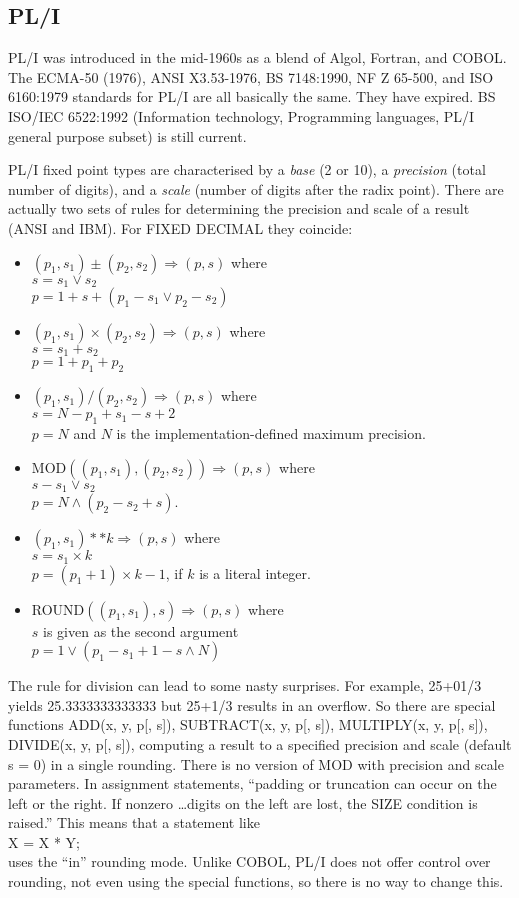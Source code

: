 \documentclass{article}
\begin{document}
\subsection{PL/I}

PL/I was introduced in the mid-1960s as a blend of Algol,
Fortran, and COBOL.  The ECMA-50 (1976), ANSI X3.53-1976, BS 7148:1990,
NF Z 65-500, and ISO 6160:1979 standards for PL/I are all basically the
same.  They have expired.  BS ISO/IEC 6522:1992 (Information technology,
Programming languages, PL/I general purpose subset) is still current.

PL/I fixed point types are characterised by a {\it base} (2 or 10),
a {\it precision} (total number of digits), and a {\it scale} (number
of digits after the radix point).  There are actually two sets of
rules for determining the precision and scale of a result (ANSI and
IBM).  For FIXED DECIMAL they coincide:
\begin{itemize}
\item
$(p_1,s_1) \pm (p_2,s_2) \Rightarrow (p,s)$ where\\
$s = s_1 \vee s_2$\\
$p = 1+s+(p_1-s_1 \vee p_2-s_2)$
\item
$(p_1,s_1) \times (p_2,s_2) \Rightarrow (p,s)$ where\\
$s = s_1 + s_2$\\
$p = 1+p_1+p_2$
\item
$(p_1,s_1) / (p_2,s_2) \Rightarrow (p,s)$ where\\
$s = N-p_1+s_1-s+2$\\
$p = N$ and $N$ is the implementation-defined maximum precision.
\item
MOD$((p_1,s_1), (p_2,s_2)) \Rightarrow (p,s)$ where\\
$s - s_1 \vee s_2$\\
$p = N \wedge (p_2 - s_2 + s)$.
\item
$(p_1,s_1) ** k \Rightarrow (p,s)$ where\\
$s = s_1\times k$\\
$p = (p_1 + 1) \times k - 1$, if $k$ is a literal integer.
\item
ROUND$((p_1,s_1), s) \Rightarrow (p,s)$ where\\
$s$ is given as the second argument\\
$p = 1 \vee (p_1-s_1+1-s \wedge N)$
\end{itemize}
The rule for division can lead to some nasty surprises.
For example, 25+01/3 yields 25.3333333333333 but
25+1/3 results in an overflow.  So there are special functions
ADD(x, y, p[, s]), SUBTRACT(x, y, p[, s]),  MULTIPLY(x, y, p[, s]),
DIVIDE(x, y, p[, s]), 
computing a result to a specified precision and scale (default s = 0)
in a single rounding.  There is no version of MOD with precision and
scale parameters.  In assignment
statements, ``padding or truncation can occur on the left or the right.
If nonzero \dots digits on the left are lost, the SIZE condition is
raised.''  This means that a statement like\\
X = X * Y;\\
uses the ``in'' rounding mode.  Unlike COBOL, PL/I does not offer
control over rounding, not even using the special functions, so there is
no way to change this.
\end{document}
